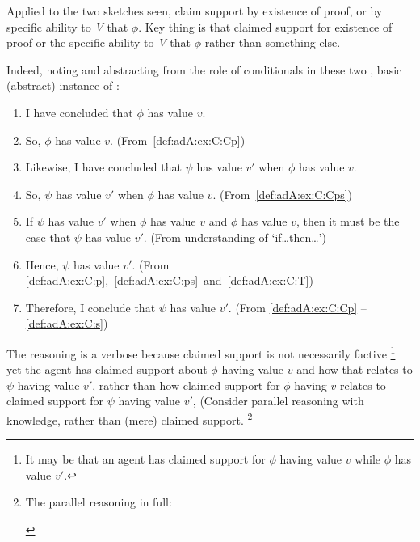 \begin{note}
  Applied to the two sketches seen, claim support by existence of proof, or by specific ability to \emph{V} that \(\phi\).
  Key thing is that claimed support for existence of proof or the specific ability to \emph{V} that \(\phi\) rather than something else.

  Indeed, noting and abstracting from the role of conditionals in these two , basic (abstract) instance of \adA{}:

  {
    \small
    \begin{enumerate}[label=\arabic*., ref=\arabic*]
    \item\label{def:adA:ex:C:Cp} I have concluded that \(\phi\) has value \(v\).
    \item\label{def:adA:ex:C:p} So, \(\phi\) has value \(v\). \hfill(From~\ref{def:adA:ex:C:Cp})
    \item\label{def:adA:ex:C:Cps} Likewise, I have concluded that \(\psi\) has value \(v'\) when \(\phi\) has value \(v\).
    \item\label{def:adA:ex:C:ps} So, \(\psi\) has value \(v'\) when \(\phi\) has value \(v\). \hfill(From~\ref{def:adA:ex:C:Cps})
    \item\label{def:adA:ex:C:T} If \(\psi\) has value \(v'\) when \(\phi\) has value \(v\) and \(\phi\) has value \(v\), then it must be the case that \(\psi\) has value \(v'\). \hfill (From understanding of `if\dots then\dots')
    \item\label{def:adA:ex:C:s} Hence, \(\psi\) has value \(v'\).\newline
      \mbox{}\hfill (From \ref{def:adA:ex:C:p},~\ref{def:adA:ex:C:ps}~and~\ref{def:adA:ex:C:T})
    \item Therefore, I conclude that \(\psi\) has value \(v'\). \hfill (From \ref{def:adA:ex:C:Cp} -- \ref{def:adA:ex:C:s})
    \end{enumerate}
  }
  The reasoning is a verbose because claimed support is not necessarily factive
  \nolinebreak
  \footnote{
    It may be that an agent has claimed support for \(\phi\) having value \(v\) while \(\phi\) has value \(v'\).
  }
  yet the agent has claimed support about \(\phi\) having value \(v\) and how that relates to \(\psi\) having value \(v'\), rather than how claimed support for \(\phi\) having \(v\) relates to claimed support for \(\psi\) having value \(v'\),
  (Consider parallel reasoning with knowledge, rather than (mere) claimed support.\nolinebreak
  \footnote{The parallel reasoning in full:
    \begin{enumerate}[label=\arabic*., ref=\arabic*]

\end{enumerate}}
\end{note}

